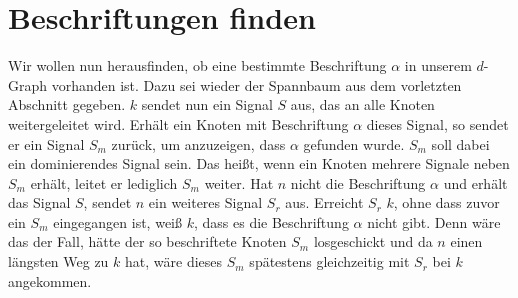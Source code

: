 \documentclass[11pt]{article}
\begin{document}
\section{Beschriftungen finden}

Wir wollen nun herausfinden, ob eine bestimmte Beschriftung $\alpha$ in unserem $d$-Graph vorhanden ist. Dazu sei wieder der Spannbaum aus dem vorletzten Abschnitt gegeben. $k$ sendet nun ein Signal $S$ aus, das an alle Knoten weitergeleitet wird. Erhält ein Knoten mit Beschriftung $\alpha$ dieses Signal, so sendet er ein Signal $S_m$ zurück, um anzuzeigen, dass $\alpha$ gefunden wurde. $S_m$ soll dabei ein dominierendes Signal sein. Das heißt, wenn ein Knoten mehrere Signale neben $S_m$ erhält, leitet er lediglich $S_m$ weiter. Hat $n$ nicht die Beschriftung $\alpha$ und erhält das Signal $S$, sendet $n$ ein weiteres Signal $S_r$ aus. Erreicht $S_r$ $k$, ohne dass zuvor ein $S_m$ eingegangen ist, weiß $k$, dass es die Beschriftung $\alpha$ nicht gibt. Denn wäre das der Fall, hätte der so beschriftete Knoten $S_m$ losgeschickt und da $n$ einen längsten Weg zu $k$ hat, wäre dieses $S_m$ spätestens gleichzeitig mit $S_r$ bei $k$ angekommen.
\end{document}
